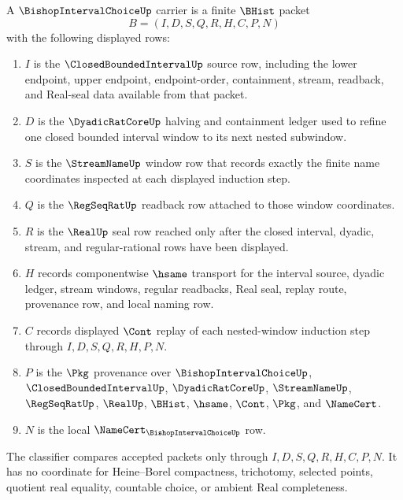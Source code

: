 \begin{definition}
\label{def:bishop-interval-choice-carrier}
A $\BishopIntervalChoiceUp$ carrier is a finite $\BHist$ packet
$$
B=(I,D,S,Q,R,H,C,P,N)
$$
with the following displayed rows:
\begin{enumerate}
\item $I$ is the $\ClosedBoundedIntervalUp$ source row, including the lower endpoint, upper endpoint, endpoint-order, containment, stream, readback, and Real-seal data available from that packet.
\item $D$ is the $\DyadicRatCoreUp$ halving and containment ledger used to refine one closed bounded interval window to its next nested subwindow.
\item $S$ is the $\StreamNameUp$ window row that records exactly the finite name coordinates inspected at each displayed induction step.
\item $Q$ is the $\RegSeqRatUp$ readback row attached to those window coordinates.
\item $R$ is the $\RealUp$ seal row reached only after the closed interval, dyadic, stream, and regular-rational rows have been displayed.
\item $H$ records componentwise $\hsame$ transport for the interval source, dyadic ledger, stream windows, regular readbacks, Real seal, replay route, provenance row, and local naming row.
\item $C$ records displayed $\Cont$ replay of each nested-window induction step through $I,D,S,Q,R,H,P,N$.
\item $P$ is the $\Pkg$ provenance over $\BishopIntervalChoiceUp$, $\ClosedBoundedIntervalUp$, $\DyadicRatCoreUp$, $\StreamNameUp$, $\RegSeqRatUp$, $\RealUp$, $\BHist$, $\hsame$, $\Cont$, $\Pkg$, and $\NameCert$.
\item $N$ is the local $\NameCert_{\BishopIntervalChoiceUp}$ row.
\end{enumerate}
The classifier compares accepted packets only through $I,D,S,Q,R,H,C,P,N$. It has no coordinate for Heine--Borel compactness, trichotomy, selected points, quotient real equality, countable choice, or ambient Real completeness.
\end{definition}

